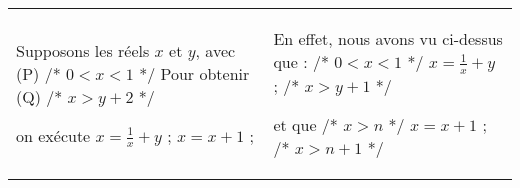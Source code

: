 \begin{tabular}{ll}
\parbox[t]{7cm}{
	Supposons les r\'eels $x$ et $y$,  avec\\
	(P) /* $0<x<1$ */\\
	Pour obtenir \\
	(Q) /* $x > y + 2$  */	

	\vspace*{5mm}

	on ex\'ecute\\
	$	x = \frac{1}{x} +y $ ;\\
	$	x = x + 1           $ ;

	\vspace*{5mm}

             } & \parbox[t]{7cm}{
	En effet, nous avons vu ci-dessus que :\\
		/* $0<x<1$ */\\
		$x = \frac{1}{x}+y$ ; \\
		/* $x>y+1$ */

	\vspace*{5mm}

		et que \\
		/* $x>n$ */\\
		$x = x+1$ ; \\
		/* $x> n+1$ */}
\end{tabular} 

